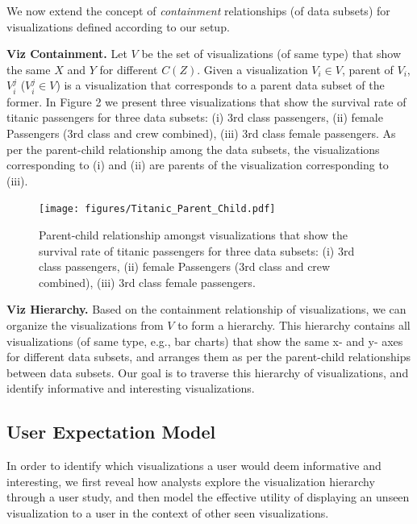 We now extend the concept of \emph{containment} relationships (of data subsets) for visualizations defined according to our setup. 

\textbf{Viz Containment.} Let $V$ be the set of visualizations (of same type) that show the same $X$ and $Y$ for different $C(Z)$. Given a visualization $V_i \in V$, parent of $V_i$, $V_i^j$ ($V_i^j\in V$) is a visualization that corresponds to a parent data subset of the former. In Figure 2 we present three visualizations that show the survival rate of titanic passengers for three data subsets: (i) 3rd class passengers, (ii) female Passengers (3rd class and crew combined), (iii) 3rd class female passengers. As per the parent-child relationship among the data subsets, the visualizations corresponding to (i) and (ii) are parents of the visualization corresponding to (iii). %

\begin{figure}[bht]
\label{example}
\centering
\texttt{[image: figures/Titanic\_Parent\_Child.pdf]}
\caption{Parent-child relationship amongst visualizations that show the survival rate of titanic passengers for three data subsets: (i) 3rd class passengers, (ii) female Passengers (3rd class and crew combined), (iii) 3rd class female passengers.}
\end{figure}

\textbf{Viz Hierarchy.} Based on the containment relationship of visualizations, we can organize the visualizations from $V$ to form a hierarchy. This hierarchy contains all visualizations (of same type, e.g., bar charts) that show the same x- and y- axes for different data subsets, and arranges them as per the parent-child relationships between data subsets. Our goal is to traverse this hierarchy of visualizations, and identify informative and interesting visualizations.

\subsection{User Expectation Model}
In order to identify which visualizations a user would deem informative and interesting, we first reveal how analysts explore the visualization hierarchy through a user study, and then model the effective utility of displaying an unseen visualization to a user in the context of other seen visualizations. 
 
